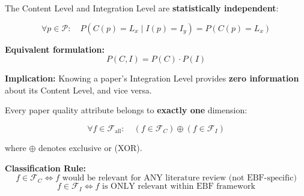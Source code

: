 \begin{tcolorbox}[colback=green!5!white, colframe=green!75!black,
    title=\textbf{Axiom MECE-2: Statistical Independence}]

The Content Level and Integration Level are \textbf{statistically independent}:

\begin{equation}
\forall p \in \mathcal{P}: \quad P(C(p) = L_x \mid I(p) = I_y) = P(C(p) = L_x)
\end{equation}

\textbf{Equivalent formulation:}
\begin{equation}
P(C, I) = P(C) \cdot P(I)
\end{equation}

\textbf{Implication:} Knowing a paper's Integration Level provides \textbf{zero information} about its Content Level, and vice versa.

\end{tcolorbox}

\begin{tcolorbox}[colback=green!5!white, colframe=green!75!black,
    title=\textbf{Axiom MECE-3: Completeness (Collectively Exhaustive)}]

Every paper quality attribute belongs to \textbf{exactly one} dimension:

\begin{equation}
\forall f \in \mathcal{F}_{\text{all}}: \quad (f \in \mathcal{F}_C) \oplus (f \in \mathcal{F}_I)
\end{equation}

where $\oplus$ denotes exclusive or (XOR).

\textbf{Classification Rule:}
\begin{equation}
f \in \mathcal{F}_C \Leftrightarrow f \text{ would be relevant for ANY literature review (not EBF-specific)}
\end{equation}
\begin{equation}
f \in \mathcal{F}_I \Leftrightarrow f \text{ is ONLY relevant within EBF framework}
\end{equation}

\end{tcolorbox}

